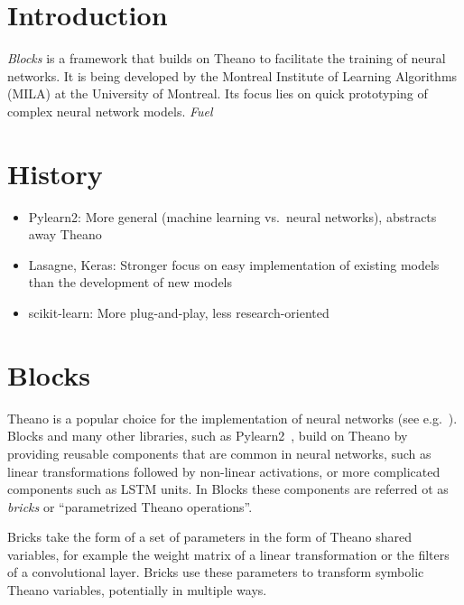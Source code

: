 \documentclass[twoside,11pt]{article}
\begin{document}
\section{Introduction}

\emph{Blocks} is a framework that builds on Theano to facilitate the training of
neural networks. It is being developed by the Montreal Institute of Learning
Algorithms (MILA) at the University of Montreal. Its focus lies on quick
prototyping of complex neural network models. \emph{Fuel} 

\section{History}


\begin{itemize}
  \item Pylearn2: More general (machine learning vs.\ neural networks), abstracts
    away Theano
  \item Lasagne, Keras: Stronger focus on easy implementation of existing models
    than the development of new models
  \item scikit-learn: More plug-and-play, less research-oriented
\end{itemize}

\section{Blocks}

Theano is a popular choice for the implementation of neural networks (see
e.g.~\cite{Goodfellow-et-al-ICML2013, Pascanu-et-al-ICML2013}). Blocks and many
other libraries, such as Pylearn2~\cite{pylearn2_arxiv_2013}, build on Theano
by providing reusable components that are common in neural networks, such as
linear transformations followed by non-linear activations, or more complicated
components such as LSTM units. In Blocks these components are referred ot as
\emph{bricks} or ``parametrized Theano operations''.

Bricks take the form of a set of parameters in the form of Theano shared
variables, for example the weight matrix of a linear transformation or the
filters of a convolutional layer. Bricks use these parameters to transform
symbolic Theano variables, potentially in multiple ways. %
\end{document}

